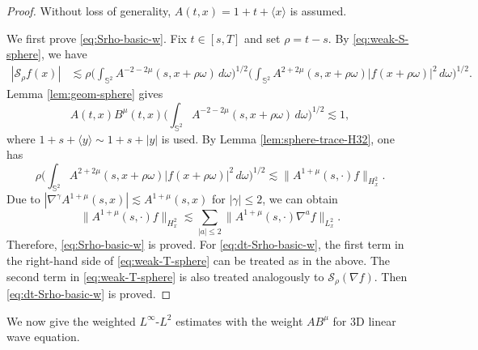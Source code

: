 \documentclass[11pt,twoside]{article}
\def\ls{\lesssim}
\newcommand{\w}[1]{\langle {#1} \rangle}
\theoremstyle{plain}
\theoremstyle{definition}
\theoremstyle{assumption}
\numberwithin{equation}{section}
\begin{document}
	\begin{proof}
		Without loss of generality, $A(t,x)=1+t+\w{x}$ is assumed.
		
	
		We first prove \eqref{eq:Srho-basic-w}. Fix $t\in[s,T]$ and set $\rho=t-s$. By
		\eqref{eq:weak-S-sphere}, we have
		\begin{equation*}
			\begin{aligned}
				|\mathcal{S}_{\rho} f(x)|
				&\ls\rho
				\big(
				\int_{\mathbb S^2}
				A^{-2-2\mu}(s,x+\rho\omega)\,d\omega
				\big)^{1/2}
				\big(
				\int_{\mathbb S^2}
				A^{2+2\mu}(s,x+\rho\omega)
				|f(x+\rho\omega)|^2\,d\omega
				\big)^{1/2}.
			\end{aligned}
		\end{equation*}
		Lemma \ref{lem:geom-sphere} gives
		\begin{equation*}
			A(t,x)B^\mu(t,x)
			\big(
			\int_{\mathbb S^2}
			A^{-2-2\mu}(s,x+\rho\omega)\,d\omega
			\big)^{1/2}
			\ls 1,
		\end{equation*}
		where $1+s+\langle y\rangle\sim1+s+|y|$ is used. By Lemma \ref{lem:sphere-trace-H32}, one has
		\begin{equation*}
			\rho
			\big(
			\int_{\mathbb S^2}
			A^{2+2\mu}(s,x+\rho\omega)
			|f(x+\rho\omega)|^2\,d\omega
			\big)^{1/2}
			\lesssim
			\|A^{1+\mu}(s,\cdot)f\|_{H^2_x}.
		\end{equation*}
		Due to $|\nabla^\gamma A^{1+\mu}(s,x)|
			\lesssim
			A^{1+\mu}(s,x)$
			for $|\gamma|\le 2$,
		we can obtain
		\begin{equation}\label{eq:weighted-H2-product-w}
			\|A^{1+\mu}(s,\cdot)f\|_{H^2_x}
			\ls
			\sum_{|a|\le2}
			\|A^{1+\mu}(s,\cdot)\nabla^a f\|_{L^2_x}.
		\end{equation}
		Therefore, \eqref{eq:Srho-basic-w} is proved. For
		\eqref{eq:dt-Srho-basic-w}, the first term in the right-hand side of
		\eqref{eq:weak-T-sphere} can be treated as in the above. The second term in \eqref{eq:weak-T-sphere}
is also treated analogously to 	$\mathcal{S}_{\rho}(\nabla f)$. Then
		\eqref{eq:dt-Srho-basic-w} is proved.
	\end{proof}
	
	We now give the weighted $L^\infty$-$L^2$ estimates with the weight $A B^\mu$ for 3D linear wave equation.
	
\end{document}
